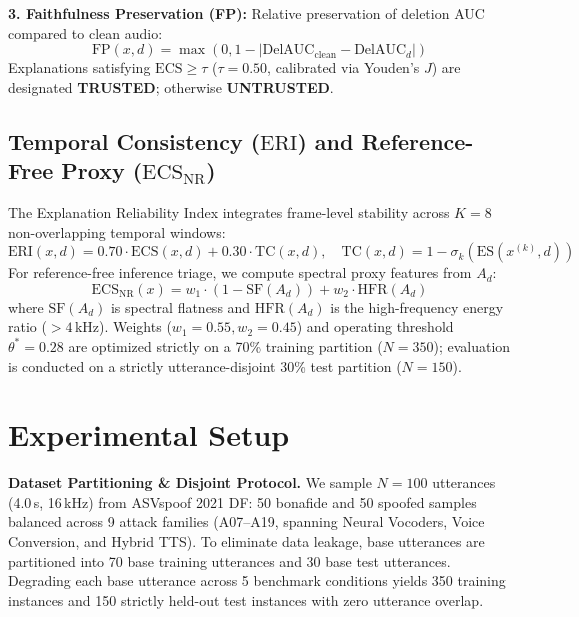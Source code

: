 \documentclass[runningheads]{llncs}
\newcommand{\ecs}{\ensuremath{\mathrm{ECS}}}
\newcommand{\ecsnr}{\ensuremath{\mathrm{ECS}_{\mathrm{NR}}}}
\newcommand{\eri}{\ensuremath{\mathrm{ERI}}}
\begin{document}
\textbf{3. Faithfulness Preservation (FP):} Relative preservation of deletion AUC compared to clean audio:
\begin{equation}
  \mathrm{FP}(x,d) = \max\left(0, 1 - |\mathrm{DelAUC}_{\text{clean}} - \mathrm{DelAUC}_d|\right)
\end{equation}
Explanations satisfying $\ecs \geq \tau$ ($\tau = 0.50$, calibrated via Youden's $J$) are designated \textbf{TRUSTED}; otherwise \textbf{UNTRUSTED}.

\subsection{Temporal Consistency (\texorpdfstring{\eri{}}{ERI}) and Reference-Free Proxy (\texorpdfstring{\ecsnr{}}{ECS-NR})}
\label{subsec:eri_proxy}
The Explanation Reliability Index integrates frame-level stability across $K=8$ non-overlapping temporal windows:
\begin{equation}
  \eri(x,d) = 0.70\cdot\ecs(x,d) + 0.30\cdot\mathrm{TC}(x,d), \quad \mathrm{TC}(x,d) = 1 - \sigma_k(\mathrm{ES}(x^{(k)},d))
\end{equation}
For reference-free inference triage, we compute spectral proxy features from $A_d$:
\begin{equation}
  \ecsnr{}(x) = w_1 \cdot (1 - \mathrm{SF}(A_d)) + w_2 \cdot \mathrm{HFR}(A_d)
\end{equation}
where $\mathrm{SF}(A_d)$ is spectral flatness and $\mathrm{HFR}(A_d)$ is the high-frequency energy ratio ($>4$\,kHz).
Weights ($w_1=0.55, w_2=0.45$) and operating threshold $\theta^* = 0.28$ are optimized strictly on a 70\% training partition ($N=350$); evaluation is conducted on a strictly utterance-disjoint 30\% test partition ($N=150$).

\section{Experimental Setup}
\label{sec:setup}

\textbf{Dataset Partitioning \& Disjoint Protocol.}
We sample $N=100$ utterances (4.0\,s, 16\,kHz) from ASVspoof 2021 DF: 50 bonafide and 50 spoofed samples balanced across 9 attack families (A07--A19, spanning Neural Vocoders, Voice Conversion, and Hybrid TTS).
To eliminate data leakage, base utterances are partitioned into 70 base training utterances and 30 base test utterances.
Degrading each base utterance across 5 benchmark conditions yields 350 training instances and 150 strictly held-out test instances with zero utterance overlap.
\end{document}
